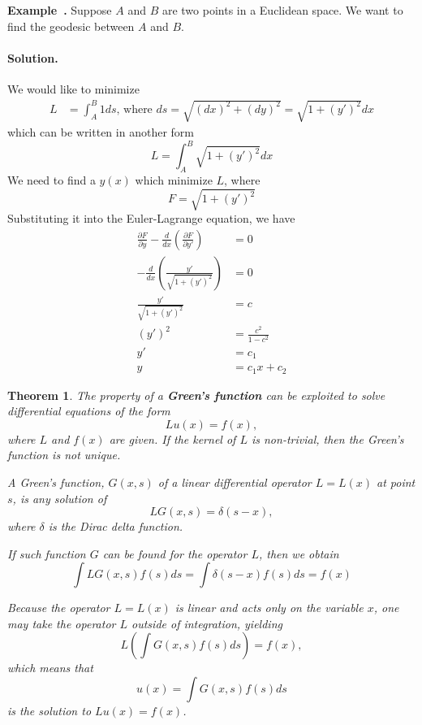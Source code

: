 \documentclass[a4paper]{article}
\theoremstyle{definition}
\theoremstyle{plain}
\newtheorem{theorem}{Theorem}
\newenvironment{example}[1][]{\refstepcounter{example}\par\medskip
   \noindent \textbf{Example~\theexample. #1} \rmfamily}{\medskip}
\newcounter{example}{Example}
\begin{document}
\begin{example}
Suppose $A$ and $B$ are two points in a Euclidean space. We want to find the geodesic between $A$ and $B$.

\paragraph{Solution.} We would like to minimize 
\begin{align*}
    L&=\int^B_A1ds\text{, where } ds=\sqrt{(dx)^2+(dy)^2}=\sqrt{1+(y')^2}dx
\end{align*}
which can be written in another form
\begin{equation*}
    L=\int^B_A\sqrt{1+(y')^2}dx
\end{equation*}
We need to find a $y(x)$ which minimize $L$, where
\begin{equation*}
    F=\sqrt{1+(y')^2}
\end{equation*}
Substituting it into the Euler-Lagrange equation, we have
\begin{align*}
    \frac{\partial F}{\partial y}-\frac{d}{dx}\left(\frac{\partial F}{\partial y'}\right)&=0\\
    -\frac{d}{dx}\left(\frac{y'}{\sqrt{1+(y')^2}}\right)&=0\\
    \frac{y'}{\sqrt{1+(y')^2}}&=c\\
    (y')^2&=\frac{c^2}{1-c^2}\\
    y'&=c_1\\
    y&=c_1x+c_2
\end{align*}
\end{example}

\begin{theorem}
The property of a \textbf{Green's function} can be exploited to solve differential equations of the form
\begin{equation*}
    Lu(x)=f(x),
\end{equation*}
where $L$ and $f(x)$ are given. If the kernel of $L$ is non-trivial, then the Green's function is not unique.

A Green's function, $G(x,s)$ of a linear differential operator $L=L(x)$ at point $s$, is any solution of
\begin{equation*}
    LG(x,s)=\delta(s-x),
\end{equation*}
where $\delta$ is the Dirac delta function.

If such function $G$ can be found for the operator $L$, then we obtain
\begin{equation*}
    \int LG(x,s)f(s)ds=\int\delta(s-x)f(s)ds=f(x)
\end{equation*}

Because the operator $L=L(x)$ is linear and acts only on the variable $x$, one may take the operator $L$ outside of integration, yielding
\begin{equation*}
    L\left(\int G(x,s)f(s)ds\right)=f(x),
\end{equation*}
which means that 
\begin{equation*}
    u(x)=\int G(x,s)f(s)ds
\end{equation*}
is the solution to $Lu(x)=f(x)$.
\end{theorem}
\end{document}

